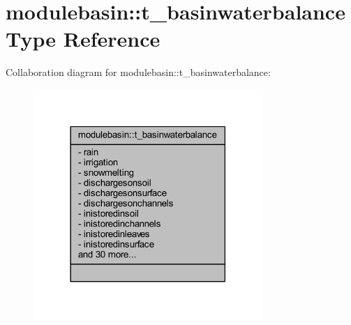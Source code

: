 \hypertarget{structmodulebasin_1_1t__basinwaterbalance}{}\section{modulebasin\+:\+:t\+\_\+basinwaterbalance Type Reference}
\label{structmodulebasin_1_1t__basinwaterbalance}


Collaboration diagram for modulebasin\+:\+:t\+\_\+basinwaterbalance\+:\nopagebreak
\begin{figure}[H]
\begin{center}
\leavevmode
\includegraphics[width=246pt]{structmodulebasin_1_1t__basinwaterbalance__coll__graph}
\end{center}
\end{figure}
